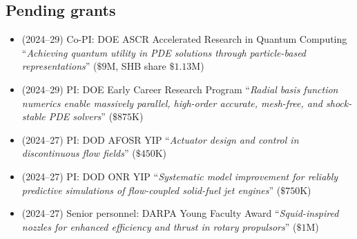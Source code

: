 \subsection{Pending grants}

\begin{itemize}

    \item (2024--29) Co-PI: DOE ASCR Accelerated Research in Quantum Computing ``\textit{Achieving quantum utility in PDE solutions through particle-based representations}'' ($\$9$M, SHB share $\$1.13$M)
    \item (2024--29) PI: DOE Early Career Research Program ``\textit{Radial basis function numerics enable massively parallel, high-order accurate, mesh-free, and shock-stable PDE solvers}'' ($\$875$K)
    \item (2024--27) PI: DOD AFOSR YIP ``\textit{Actuator design and control in discontinuous flow fields}'' ($\$450$K)
    \item (2024--27) PI: DOD ONR YIP ``\textit{Systematic model improvement for reliably predictive simulations of flow-coupled solid-fuel jet engines}'' ($\$750$K)
    \item (2024--27) Senior personnel: DARPA Young Faculty Award ``\textit{Squid-inspired nozzles for enhanced  efficiency and thrust in rotary propulsors}'' ($\$1$M)
\end{itemize}

